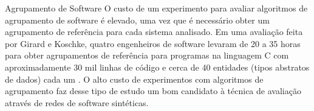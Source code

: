 \begin{section}{Agrupamento de Software}
O custo de um experimento para avaliar algoritmos de agrupamento de software é elevado, uma vez que é necessário obter um agrupamento de referência para cada sistema analisado. Em uma avaliação feita por Girard e Koschke, quatro engenheiros de software levaram de 20 a 35 horas para obter agrupamentos de referência para programas na linguagem C com aproximadamente 30 mil linhas de código e cerca de 40 entidades (tipos abstratos de dados) cada um \cite{Girard2000}. O alto custo de experimentos com algoritmos de agrupamento faz desse tipo de estudo um bom candidato à técnica de avaliação através de redes de software sintéticas.


\end{section}

